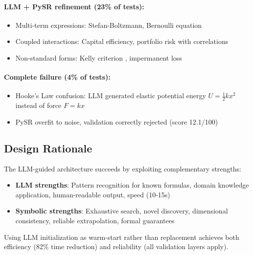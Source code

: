 \documentclass[twoside,11pt]{article}
\begin{document}
\paragraph{LLM + PySR refinement (23\% of tests):}\citep{kambhampati2024llms}
\begin{itemize}
\item Multi-term expressions: Stefan-Boltzmann, Bernoulli equation
\item Coupled interactions: Capital efficiency, portfolio risk with correlations
\item Non-standard forms: Kelly criterion \citep{kelly1956criterion}, impermanent loss
\end{itemize}

\paragraph{Complete failure (4\% of tests):}
\begin{itemize}
\item Hooke's Law confusion: LLM generated elastic potential energy $U = \frac{1}{2}kx^2$ instead of force $F = kx$\citep{kambhampati2024llms}
\item PySR overfit to noise, validation correctly rejected (score 12.1/100)
\end{itemize}

\subsection{Design Rationale}

The LLM-guided architecture succeeds by exploiting complementary strengths:\citep{kambhampati2024llms}

\begin{itemize}
\item \textbf{LLM strengths}: Pattern recognition for known formulas, domain knowledge application, human-readable output, speed (10-15s)\citep{kambhampati2024llms}
\item \textbf{Symbolic strengths}: Exhaustive search, novel discovery, dimensional consistency, reliable extrapolation, formal guarantees\citep{koza1994genetic}
\end{itemize}

Using LLM initialization as warm-start rather than replacement achieves both efficiency (82\% time reduction) and reliability (all validation layers apply)\citep{kambhampati2024llms}.

\end{document}
